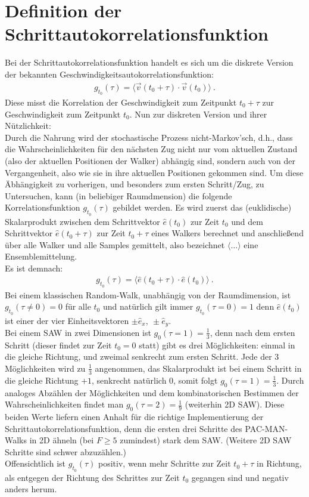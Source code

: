 \documentclass[a4paper, 12pt]{report}
\begin{document}
\section{Definition der Schrittautokorrelationsfunktion}
Bei der Schrittautokorrelationsfunktion handelt es sich um die diskrete Version der bekannten Geschwindigkeitsautokorrelationsfunktion:
\begin{align}
g_{t_0}(\tau) = \langle \vec{v}(t_0+\tau) \cdot \vec{v}(t_0) \rangle\ .
\end{align}
Diese misst die Korrelation der Geschwindigkeit zum Zeitpunkt $t_0+\tau$ zur Geschwindigkeit zum Zeitpunkt $t_0$. Nun zur diskreten Version und ihrer Nützlichkeit:
\\
Durch die Nahrung wird der stochastische Prozess nicht-Markov'sch, d.h., dass die Wahrscheinlichkeiten für den nächsten Zug nicht nur vom aktuellen Zustand (also der aktuellen Positionen der Walker) abhängig sind, sondern auch von der Vergangenheit, also wie sie in ihre aktuellen Positionen gekommen sind. Um diese Äbhängigkeit zu vorherigen, und besonders zum ersten Schritt/Zug, zu Untersuchen, kann (in beliebiger Raumdmension) die folgende Korrelationsfunktion $g_{t_0}(\tau)$ gebildet werden. Es wird zuerst das (euklidische) Skalarprodukt zwischen dem Schrittvektor $\hat{e}(t_0)$ zur Zeit $t_0$ und dem Schrittvektor \break $\hat{e}(t_0+\tau)$ zur Zeit $t_0 + \tau$ eines Walkers berechnet und anschließend über alle Walker und alle Samples gemittelt, also bezeichnet $\langle \dots \rangle$ eine Ensemblemittelung. \\
\noindent Es ist demnach:
\begin{align}
g_{t_0}(\tau) = \langle \hat{e}(t_0+\tau) \cdot \hat{e}(t_0) \rangle\ .
\end{align}
Bei einem klassischen Random-Walk, unabhängig von der Raumdimension, ist $g_{t_0}(\tau \neq 0)= 0$ für alle $t_0$ und natürlich gilt immer $g_{t_0}(\tau = 0)= 1$ denn $\hat{e}(t_0)$ ist einer der vier Einheitsvektoren $\pm \hat{e}_x,\ \pm \hat{e}_y$.
\\
\noindent Bei einem SAW in zwei Dimensionen ist $g_{0}(\tau = 1)= \frac{1}{3}$, denn nach dem ersten Schritt (dieser findet zur Zeit $t_0=0$ statt) gibt es drei Möglichkeiten: einmal in die gleiche Richtung, und zweimal senkrecht zum ersten Schritt. Jede der 3 Möglichkeiten wird zu $\frac{1}{3}$ angenommen, das Skalarprodukt ist bei einem Schritt in die gleiche Richtung $+1$, senkrecht natürlich $0$, somit folgt $g_{0}(\tau = 1)= \frac{1}{3}$. Durch analoges Abzählen der Möglichkeiten und dem kombinatorischen Bestimmen der Wahrscheinlichkeiten findet man $g_{0}(\tau = 2)= \frac{1}{9}$ (weiterhin 2D SAW). Diese beiden Werte liefern einen Anhalt für die richtige Implementierung der Schrittautokorrelationsfunktion, denn die ersten drei Schritte des PAC-MAN-Walks in 2D ähneln (bei $F \geq 5$ zumindest) stark dem SAW. (Weitere 2D SAW Schritte sind schwer abzuzählen.)
\\ 
Offensichtlich ist $g_{t_0}(\tau)$ positiv, wenn mehr Schritte zur Zeit $t_0+\tau$ in Richtung, als entgegen der Richtung des Schrittes zur Zeit $t_0$ gegangen sind und negativ anders herum. 
\end{document}

